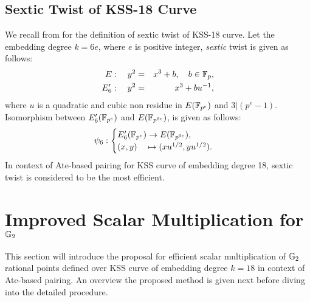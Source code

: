 \subsection{Sextic Twist of KSS-18 Curve}  
We recall  from  for the definition of sextic twist of KSS-18 curve.
Let the embedding degree $k = 6e$, where $e$ is positive integer, \textit{sextic} twist is given as follows:
\begin{eqnarray}
E:  \quad y^2 & = & x^3+b, \quad b \in {\mathbb{F}}_{p}, \\
E'_6: \quad y^2 & =  & x^3+bu^{-1},
\end{eqnarray}  
where $u$ is a quadratic and cubic non residue in $E({\mathbb{F}}_{p^{e}})$ and $3|(p^e-1)$.  Isomorphism between $E'_6({\mathbb{F}}_{p^{e}})$ and $E({\mathbb{F}}_{p^{6e}})$, is given as follows:
\begin{eqnarray}
\psi_6 : \begin{cases}
E'_6({\mathbb{F}}_{p^{e}}) \rightarrow E({\mathbb{F}}_{p^{6e}}),\\
(x,y) \quad \mapsto (xu^{1/2},yu^{1/2}).
\end{cases}
\end{eqnarray}
In context of Ate-based pairing for KSS curve of embedding degree 18, sextic twist is considered to be the most efficient.

\section{Improved Scalar Multiplication for \texorpdfstring{${\mathbb{G}}_{2}$}{G2}}
This section will introduce the proposal for efficient scalar multiplication of ${\mathbb{G}}_{2}$ rational points defined over KSS curve of embedding degree $k=18$ in context of Ate-based pairing. 
An overview the proposed method is given next before diving into the detailed procedure.
